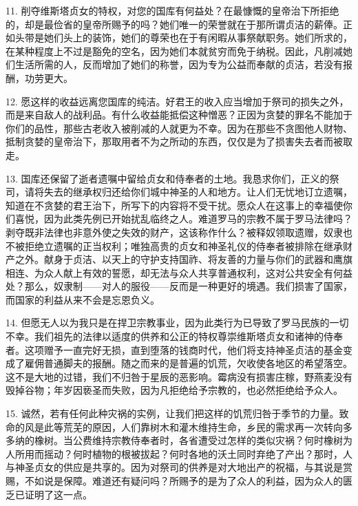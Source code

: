 11. 削夺维斯塔贞女的特权，对您的国库有何益处？在最慷慨的皇帝治下所拒绝的，却是最俭省的皇帝所赐予的吗？她们唯一的荣誉就在于那所谓贞洁的薪俸。正如头带是她们头上的装饰，她们的尊荣也在于有闲暇从事祭献职务。她们所求的，在某种程度上不过是豁免的空名，因为她们本就贫穷而免于纳税。因此，凡削减她们生活所需的人，反而增加了她们的称誉，因为专为公益而奉献的贞洁，若没有报酬，功劳更大。\par

12. 愿这样的收益远离您国库的纯洁。好君王的收入应当增加于祭司的损失之外，而是来自敌人的战利品。有什么收益能抵偿这种憎恶？正因为贪婪的罪名不能加于你们的品性，那些古老收入被削减的人就更为不幸。因为在那些不贪图他人财物、抵制贪婪的皇帝治下，那取用者不为之所动的东西，仅仅是为了损害失去者而被取走。\par

13. 国库还保留了逝者遗嘱中留给贞女和侍奉者的土地。我恳求你们，正义的祭司，请将失去的继承权归还给你们城中神圣的人和地方。让人们无忧地订立遗嘱，知道在不贪婪的君王治下，所写下的内容将不受干扰。愿众人在这事上的幸福使你们喜悦，因为此类先例已开始扰乱临终之人。难道罗马的宗教不属于罗马法律吗？剥夺既非法律也非意外使之失效的财产，这该称作什么？被释奴领取遗赠，奴隶也不被拒绝立遗嘱的正当权利；唯独高贵的贞女和神圣礼仪的侍奉者被排除在继承财产之外。献身于贞洁、以天上的守护支持国祚、将友善的力量与你们的武器和鹰旗相连、为众人献上有效的誓愿，却无法与众人共享普通权利，这对公共安全有何益处？那么，奴隶制——对人的服役——反而是一种更好的境遇。我们损害了国家，而国家的利益从来不会是忘恩负义。\par

14. 但愿无人以为我只是在捍卫宗教事业，因为此类行为已导致了罗马民族的一切不幸。我们祖先的法律以适度的供养和公正的特权尊崇维斯塔贞女和诸神的侍奉者。这项赠予一直完好无损，直到堕落的钱商时代，他们将支持神圣贞洁的基金变成了雇佣普通脚夫的报酬。随之而来的是普遍的饥荒，欠收使各地区的希望落空。这不是大地的过错，我们不归咎于星辰的恶影响。霉病没有损害庄稼，野燕麦没有毁掉谷物；年岁因亵圣而失败，因为凡拒绝给予宗教的，也必然拒绝给予众人。\par

15. 诚然，若有任何此种灾祸的实例，让我们把这样的饥荒归咎于季节的力量。致命的风是此等荒芜的原因，人们靠树木和灌木维持生命，乡民的需求再一次转向多多纳的橡树。当公费维持宗教侍奉者时，各省遭受过怎样的类似灾祸？何时橡树为人所用而摇动？何时植物的根被拔起？何时各地的沃土同时弃绝了产出？那时，人与神圣贞女的供应是共享的。因为对祭司的供养是对大地出产的祝福，与其说是赏赐，不如说是保障。难道还有疑问吗？所赐予的是为了众人的利益，因为众人的匮乏已证明了这一点。\par


